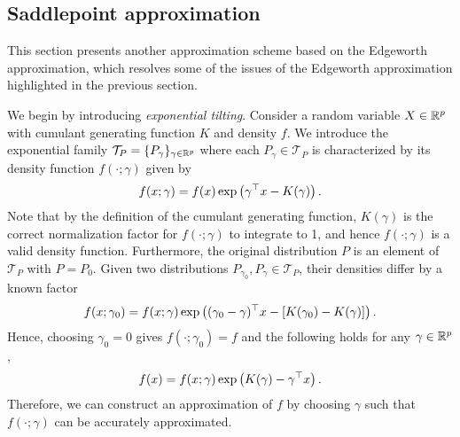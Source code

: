 \subsection{Saddlepoint approximation} \label{sec-saddlepoint}

This section presents another approximation scheme based on the Edgeworth approximation, which resolves some of the issues of the Edgeworth approximation highlighted in the previous section.

We begin by introducing \textit{exponential tilting}. Consider a random variable $X \in {\mathbb{R}^p}$ with cumulant generating function $K$ and density $f$. We introduce the exponential family $\mathcal{T}_P = \{ P_\gamma \}_{\gamma \in {\mathbb{R}^p}}$ where each $P_\gamma \in \mathcal{T}_P$ is characterized by its density function $f(\cdot; \gamma)$ given by
\begin{equation*}
    f(x; \gamma) = f(x)\exp\left(\gamma^\top x - K(\gamma)\right).
\end{equation*}
Note that by the definition of the cumulant generating function, $K(\gamma)$ is the correct normalization factor for $f(\cdot; \gamma)$ to integrate to 1, and hence $f(\cdot; \gamma)$ is a valid density function. Furthermore, the original distribution $P$ is an element of $\mathcal{T}_P$ with $P = P_0$. Given two distributions $P_{\gamma_0}, P_\gamma \in \mathcal{T}_P$, their densities differ by a known factor
\begin{equation*}
    f(x; \gamma_0) = f(x; \gamma)\exp\left((\gamma_0 - \gamma)^\top x - \left[K(\gamma_0) - K(\gamma)\right]\right).
\end{equation*} 
Hence, choosing $\gamma_0 = 0$ gives $f(\cdot; \gamma_0) = f$ and the following holds for any $\gamma \in {\mathbb{R}^p}$,
\begin{equation} \label{eq-saddlepoint-original}
    f(x) = f(x; \gamma)\exp\left(K(\gamma) - \gamma^\top x\right).
\end{equation}
Therefore, we can construct an approximation of $f$ by choosing $\gamma$ such that $f(\cdot; \gamma)$ can be accurately approximated.


